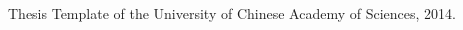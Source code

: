 
\begin{publications}{99}

\item Thesis Template of the University of Chinese Academy of Sciences, 2014.

\end{publications}
